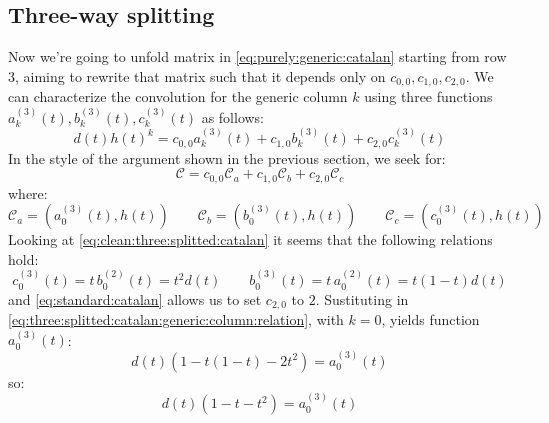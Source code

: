 \subsection{Three-way splitting}

Now we're going to unfold matrix in \autoref{eq:purely:generic:catalan} starting from row $3$,
aiming to rewrite that matrix such that it depends only on $c_{0,0}, c_{1,0}, c_{2,0}$.
We can characterize the convolution for the generic column $k$ using three
functions $a_{k}^{(3)}(t), b_{k}^{(3)}(t), c_{k}^{(3)}(t)$ as follows:
\begin{equation} 
    d(t)h(t)^{k} = c_{0,0}a_{k}^{(3)}(t) + c_{1,0}b_{k}^{(3)}(t) + c_{2,0}c_{k}^{(3)}(t)
    \label{eq:three:splitted:catalan:generic:column:relation}
\end{equation} 
In the style of the argument shown in the previous section, we seek for:
\begin{equation} 
    \mathcal{C} = c_{0,0}\mathcal{C}_{a} + c_{1,0}\mathcal{C}_{b} + c_{2,0}\mathcal{C}_{c}
    \label{eq:three:splitted:catalan:riordan:expansion}
\end{equation} 
where:
\begin{displaymath} 
    \mathcal{C}_{a} = \left(a_{0}^{(3)}(t), h(t)\right) \quad \quad 
    \mathcal{C}_{b} = \left(b_{0}^{(3)}(t), h(t)\right) \quad \quad 
    \mathcal{C}_{c} = \left(c_{0}^{(3)}(t), h(t)\right) \quad \quad 
\end{displaymath} 
Looking at \autoref{eq:clean:three:splitted:catalan} it seems that the following relations hold:
\begin{displaymath} 
    c_{0}^{(3)}(t) = t\,b_{0}^{(2)}(t) = t^{2}d(t) \quad \quad 
    b_{0}^{(3)}(t) = t\,a_{0}^{(2)}(t) = t(1-t)d(t)
\end{displaymath} 
and \autoref{eq:standard:catalan} allows us to set $c_{2,0}$ to $2$. Sustituting in
\autoref{eq:three:splitted:catalan:generic:column:relation}, with $k=0$, yields
function $a_{0}^{(3)}(t)$:
\begin{displaymath} 
    d(t)\left(1 -t(1-t) -2t^{2}\right) = a_{0}^{(3)}(t)
\end{displaymath} 
so:
\begin{displaymath} 
    d(t)\left(1 -t -t^{2}\right) = a_{0}^{(3)}(t)
\end{displaymath} 
